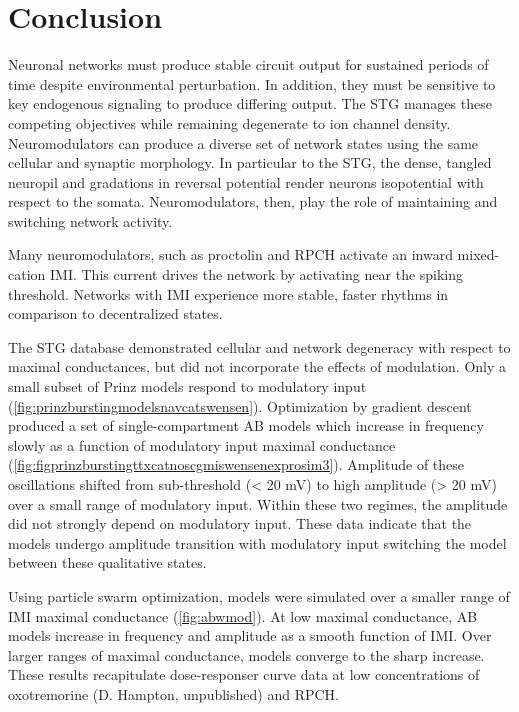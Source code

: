 \chapter{Conclusion}\label{ch:conclusion} %

Neuronal networks must produce stable circuit output for sustained periods of time despite environmental perturbation. In addition, they must be sensitive to key endogenous signaling to produce differing output. The \acs{STG} manages these competing objectives while remaining degenerate to ion channel density. Neuromodulators can produce a diverse set of network states using the same cellular and synaptic morphology. In particular to the \acs{STG}, the dense, tangled neuropil and gradations in reversal potential render neurons isopotential with respect to the somata. Neuromodulators, then, play the role of maintaining and switching network activity. 

Many neuromodulators, such as proctolin and \acs{RPCH} activate an inward mixed-cation \ac{IMI}. This current drives the network by activating near the spiking threshold. Networks with \acs{IMI} experience more stable, faster rhythms in comparison to decentralized states.

The \acs{STG} database demonstrated cellular and network degeneracy with respect to maximal conductances, but did not incorporate the effects of modulation. Only a small subset of Prinz models respond to modulatory input (\autoref{fig:prinzburstingmodelsnavcatswensen}). Optimization by gradient descent produced a set of single-compartment \acs{AB} models which increase in frequency slowly as a function of modulatory input maximal conductance (\autoref{fig:figprinzburstingttxcatnoscgmiswensenexprosim3}). Amplitude of these oscillations shifted from sub-threshold (< 20 mV) to high amplitude (> 20 mV) over a small range of modulatory input. Within these two regimes, the amplitude did not strongly depend on modulatory input. These data indicate that the models undergo amplitude transition with modulatory input switching the model between these qualitative states.

Using particle swarm optimization, models were simulated over a smaller range of \acs{IMI} maximal conductance (\autoref{fig:abwmod}). At low maximal conductance, \acs{AB} models increase in frequency and amplitude as a smooth function of \acs{IMI}. Over larger ranges of maximal conductance, models converge to the sharp increase. These results recapitulate dose-responser curve data at low concentrations of oxotremorine (D. Hampton, unpublished) and \acs{RPCH}\autocite{NusbaumNeuronalRoleCrustacean1988}.

